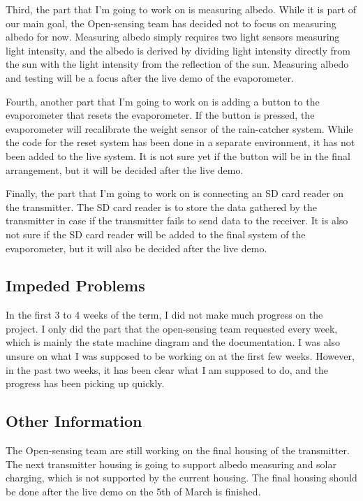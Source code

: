 \documentclass[onecolumn, draftclsnofoot,10pt, compsoc]{IEEEtran}
\begin{document}
Third, the part that I’m going to work on is measuring albedo. While it is part of our main goal, the Open-sensing team has decided not to focus on measuring albedo for now. Measuring albedo simply requires two light sensors measuring light intensity, and the albedo is derived by dividing light intensity directly from the sun with the light intensity from the reflection of the sun. Measuring albedo and testing will be a focus after the live demo of the evaporometer. 


Fourth, another part that I’m going to work on is adding a button to the evaporometer that resets the evaporometer. If the button is pressed, the evaporometer will recalibrate the weight sensor of the rain-catcher system. While the code for the reset system has been done in a separate environment, it has not been added to the live system. It is not sure yet if the button will be in the final arrangement, but it will be decided after the live demo. 


Finally, the part that I’m going to work on is connecting an SD card reader on the transmitter. The SD card reader is to store the data gathered by the transmitter in case if the transmitter fails to send data to the receiver. It is also not sure if the SD card reader will be added to the final system of the evaporometer, but it will also be decided after the live demo.


\subsection{Impeded Problems}
In the first 3 to 4 weeks of the term, I did not make much progress on the project. I only did the part that the open-sensing team requested every week, which is mainly the state machine diagram and the documentation. I was also unsure on what I was supposed to be working on at the first few weeks. However, in the past two weeks, it has been clear what I am supposed to do, and the progress has been picking up quickly. 

\subsection{Other Information}
The Open-sensing team are still working on the final housing of the transmitter. The next transmitter housing is going to support albedo measuring and solar charging, which is not supported by the current housing. The final housing should be done after the live demo on the 5th of March is finished.
\end{document}
